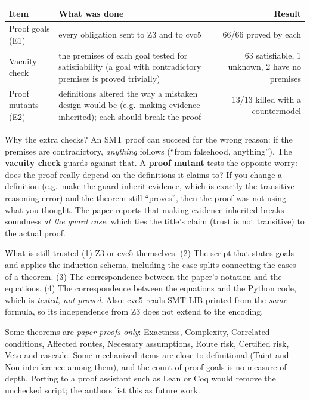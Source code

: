 \begin{center}
\renewcommand{\arraystretch}{1.25}
\begin{tabularx}{\textwidth}{@{}lXr@{}}
\toprule
\textbf{Item} & \textbf{What was done} & \textbf{Result}\\
\midrule
Proof goals (E1) & every obligation sent to Z3 and to cvc5 & 66/66 proved by each\\
Vacuity check & the premises of each goal tested for satisfiability (a goal with contradictory premises is proved trivially) & 63 satisfiable, 1 unknown, 2 have no premises\\
Proof mutants (E2) & definitions altered the way a mistaken design would be (e.g.\ making evidence inherited); each should break the proof & 13/13 killed with a countermodel\\
\bottomrule
\end{tabularx}
\end{center}

Why the extra checks? An SMT proof can succeed for the wrong reason: if the premises are contradictory, \emph{anything} follows (``from falsehood, anything''). The \textbf{vacuity check} guards against that. A \textbf{proof mutant} tests the opposite worry: does the proof really depend on the definitions it claims to? If you change a definition (e.g.\ make the guard inherit evidence, which is exactly the transitive-reasoning error) and the theorem still ``proves'', then the proof was not using what you thought. The paper reports that making evidence inherited breaks soundness \emph{at the guard case}, which ties the title's claim (trust is not transitive) to the actual proof.

\begin{warning}{What is still trusted}
(1) Z3 or cvc5 themselves. (2) The script that states goals and applies the induction schema, including the case splits connecting the cases of a theorem. (3) The correspondence between the paper's notation and the equations. (4) The correspondence between the equations and the Python code, which is \emph{tested, not proved}. Also: cvc5 reads SMT-LIB printed from the \emph{same} formula, so its independence from Z3 does not extend to the encoding.

Some theorems are \emph{paper proofs only}: Exactness, Complexity, Correlated conditions, Affected routes, Necessary assumptions, Route risk, Certified risk, Veto and cascade. Some mechanized items are close to definitional (Taint and Non-interference among them), and the count of proof goals is no measure of depth. Porting to a proof assistant such as Lean or Coq would remove the unchecked script; the authors list this as future work.
\end{warning}

